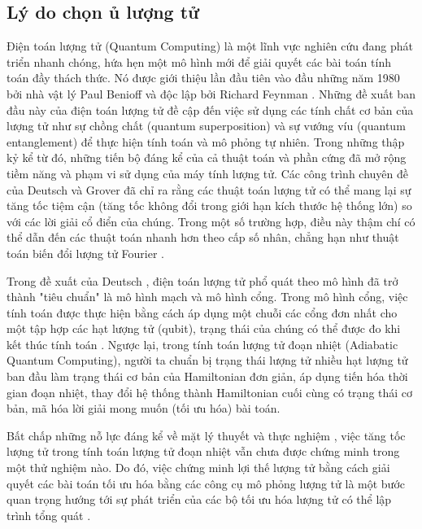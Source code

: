 \subsection{Lý do chọn ủ lượng tử}

Điện toán lượng tử (Quantum Computing) là một lĩnh vực nghiên cứu đang phát triển nhanh chóng, hứa hẹn một mô hình mới để giải quyết các bài toán tính toán đầy thách thức. Nó được giới thiệu lần đầu tiên vào đầu những năm 1980 bởi nhà vật lý Paul Benioff
\cite{The computer as a physical system}
và độc lập bởi Richard Feynman
\cite{Simulating physics with computers}.
Những đề xuất ban đầu này của điện toán lượng tử đề cập đến việc sử dụng các tính chất cơ bản của lượng tử như sự chồng chất (quantum superposition) và sự vướng víu (quantum entanglement) để thực hiện tính toán và mô phỏng tự nhiên. Trong những thập kỷ kể từ đó, những tiến bộ đáng kể của cả thuật toán và phần cứng đã mở rộng tiềm năng và phạm vi sử dụng của máy tính lượng tử. Các công trình chuyên đề của Deutsch 
\cite{Quantum computational networks}
và Grover 
\cite{A Fast Quantum Mechanical Algorithm for Database Search}
đã chỉ ra rằng các thuật toán lượng tử có thể mang lại sự tăng tốc tiệm cận (tăng tốc không đổi trong giới hạn kích thước hệ thống lớn) so với các lời giải cổ điển của chúng.
Trong một số trường hợp, điều này thậm chí có thể dẫn đến các thuật toán nhanh hơn theo cấp số nhân, chẳng hạn như 
thuật toán biến đổi lượng tử Fourier
\cite{An approximate Fourier transform useful in quantum factoring}. 


Trong đề xuất của Deutsch \cite{Quantum computational networks}, điện toán lượng tử phổ quát theo mô hình đã trở thành "tiêu chuẩn" là mô hình mạch và mô hình cổng. Trong mô hình cổng, việc tính toán được thực hiện bằng cách áp dụng một chuỗi các cổng đơn nhất cho một tập hợp các hạt lượng tử (qubit), trạng thái của chúng có thể được đo khi kết thúc tính toán 
\cite{Quantum computational networks}
. Ngược lại, trong tính toán lượng tử đoạn nhiệt (Adiabatic Quantum Computing), người ta chuẩn bị trạng thái lượng tử nhiều hạt lượng tử ban đầu làm trạng thái cơ bản của Hamiltonian đơn giản, áp dụng tiến hóa thời gian đoạn nhiệt, thay đổi hệ thống thành Hamiltonian cuối cùng có trạng thái cơ bản, mã hóa lời giải mong muốn (tối ưu hóa) bài toán. 

Bất chấp những nỗ lực đáng kể về mặt lý thuyết     \cite{Adiabatic quantum computation} và thực nghiệm     \cite{Evidence for quantum annealing with more than one hundred qubits}, việc tăng tốc lượng tử trong tính toán lượng tử đoạn nhiệt vẫn chưa được chứng minh trong một thử nghiệm nào. Do đó, việc chứng minh lợi thế lượng tử bằng cách giải quyết các bài toán tối ưu hóa bằng các công cụ mô phỏng lượng tử là một bước quan trọng hướng tới sự phát triển của các bộ tối ưu 
hóa lượng tử có thể lập trình tổng quát     \cite{A quantum annealin architecture with all-to-all connectivity from local interactions} \cite{Minor-embedding in adiabatic quantum computation: I. the parameter setting problem}.


